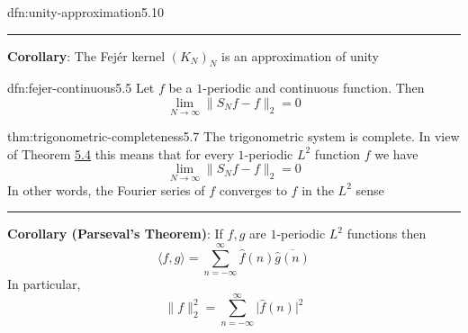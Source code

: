 \documentclass[landscape, 8pt]{extarticle}
\begin{document}
\begin{multicols}{3}
\begin{dfn}{dfn:unity-approximation}{5.10}
	\noindent\rule{\textwidth}{0.2pt}
	\textbf{Corollary}: The Fejér kernel $(K_{N})_{N}$ is an approximation of unity
\end{dfn}

\begin{lma}[]{dfn:fejer-continuous}{5.5}
	Let $f$ be a $1$-periodic and continuous function. Then
	\[\lim_{N\to \infty} \lVert S_{N} f - f \rVert_{2} = 0\]
\end{lma}

\begin{thm}{thm:trigonometric-completeness}{5.7}
	The trigonometric system is complete. In view of Theorem \hyperref[dfn:complete-orthonormal-system]{5.4} this means that for every $1$-periodic $L^{2}$ function $f$ we have
	\[\lim_{N\to \infty} \lVert S_{N} f - f \rVert_{2} = 0\]
	In other words, the Fourier series of $f$ converges to $f$ in the $L^{2}$ sense

	\noindent\rule{\textwidth}{0.2pt}
	\textbf{Corollary (Parseval's Theorem)}: If $f, g$ are $1$-periodic $L^{2}$ functions then
	\[\langle f, g \rangle = \sum_{n = -\infty}^{\infty} \widehat{f}(n) \overline{\widehat{g}(n)}\]
	In particular,
	\[\lVert f \rVert^{2}_{2} = \sum_{n = -\infty}^{\infty} \lvert \widehat{f}(n) \rvert^{2}\]
\end{thm}


\lipsum[1-12]
\end{multicols}
\end{document}

